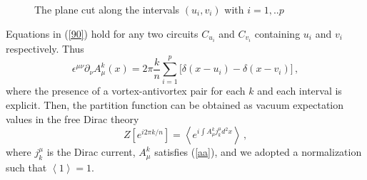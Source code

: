 \documentclass[a4paper]{article}
\begin{document}
\begin{figure} [tbp]
\centering
\leavevmode
\epsfxsize=10cm
\bigskip
{}
\caption{The plane cut along the intervals $(u_i,v_i)$ with $i=1,..p$}
\label{fihi}
\end{figure}



Equations in (\ref{90}) hold for any two circuits
$C_{u_{i}}$ and $C_{v_{i}}$  containing $u_{i}$ and $v_{i}$
respectively. Thus
\begin{equation}
\epsilon ^{\mu \nu }\partial _{\nu}A_{\mu }^{k}(x)=2\pi \frac{k}{n}
\sum_{i=1}^{p}\big[ \delta (x-u_{i})-\delta (x-v_{i})\big] \,,  \label{aa}
\end{equation}
where the presence of a vortex-antivortex pair for each $k$ and each interval is
explicit.  
Then, the partition function  can be obtained as vacuum expectation values in the free Dirac
theory 
\begin{equation}
Z[e^{i 2 \pi k/n}]=\left\langle e^{i\int A_{\mu }^{k}j_{k}^{\mu }d^{2}x}\right\rangle \,,
\label{fj}
\end{equation}
where $j_{k}^{\mu }$ is the Dirac current, $A_{\mu }^{k}$ satisfies
(\ref {aa}), and we adopted a normalization such that $\left\langle 1
\right\rangle = 1$.
\end{document}
